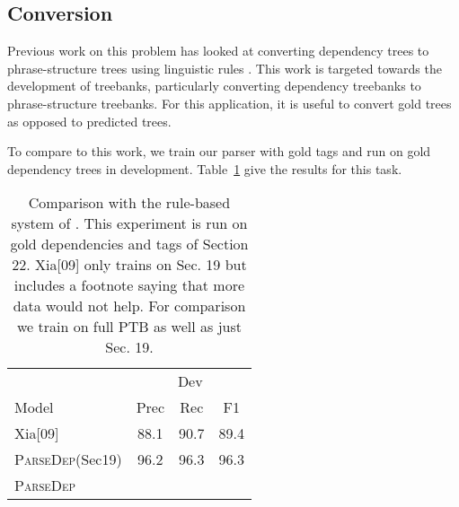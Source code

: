 \documentclass[11pt,letterpaper]{article}
\begin{document}
\subsection{Conversion}

Previous work on this problem has looked at converting dependency trees to phrase-structure trees using linguistic rules \cite{xia2001converting,xia2009towards}. This work is targeted towards the development of treebanks, particularly converting dependency treebanks to phrase-structure treebanks.
For this application, it is useful to convert gold trees as opposed to predicted trees.

To compare to this work, we train our parser with gold tags and run on gold dependency trees in development. Table~\ref{tab:convert} give the results for this task.


\begin{table}
  \centering
  \begin{tabular}{|l|ccc|}

    \hline
    & \multicolumn{3}{|c|}{Dev} \\
    Model & Prec & Rec & F1  \\
    \hline

    \hline
    Xia[09]  & 88.1 & 90.7 & 89.4 \\
    \textsc{ParseDep}(Sec19)  & 96.2 & 96.3  & 96.3 \\
    \textsc{ParseDep}  &  &  &    \\
    \hline

  \end{tabular}
  \caption{Comparison with the rule-based system of . 
    This experiment is run on gold dependencies and tags of Section 22. 
    Xia[09] only trains on Sec. 19 but includes a footnote saying that more data
    would not help. For comparison we train on full PTB as well as just Sec. 19.
  }
  \label{tab:convert}
\end{table}


\end{document}
